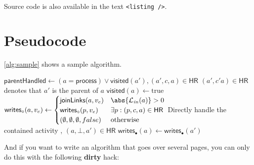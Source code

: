 \begin{filecontents*}{\democodefile}
Source code is also available in the text \lstinline|<listing />|.
\end{filecontents*}


\section{Pseudocode}
\autoref{alg:sample} shows a sample algorithm.
\begin{Algorithmus} %
  \caption{Sample algorithm}
  \label{alg:sample}
  \begin{algorithmic}
\State $\mathsf{parentHandled} \gets (a = \mathsf{process}) \lor \mathsf{visited}(a'), (a',c,a) \in \mathsf{HR}$
\State \Comment $(a',c'a) \in \mathsf{HR}$ denotes that $a'$ is the parent of $a$
\State $\mathsf{visited}(a) \gets \text{true}$
\State $\mathsf{writes}_\circ(a,v_e) \gets
\begin{cases}
\mathsf{joinLinks}(a,v_e) & \abs{\mathcal{L}_\mathit{in}(a)} > 0\\
\mathsf{writes}_\circ(p,v_e)
& \exists p: (p,c,a) \in \mathsf{HR}\\
(\emptyset, \emptyset, \emptyset, false) & \text{otherwise}
\end{cases}
$
  \State {}
  \State {}
 \Comment Directly handle the contained activity
  \State {}, $(a,\bot,a') \in \mathsf{HR}$
  \State $\mathsf{writes}_\bullet(a) \gets \mathsf{writes}_\bullet(a')$
\EndIf
{}
  \State {}
\EndFor
\EndIf
\EndProcedure
  \end{algorithmic}
\end{Algorithmus}

\clearpage
And if you want to write an algorithm that goes over several pages, you can only do this with the following \textbf{dirty} hack:

